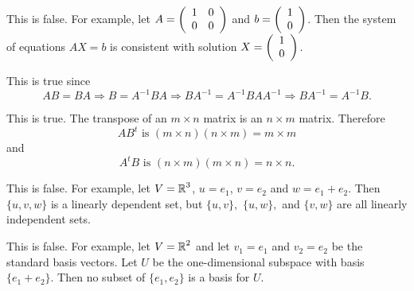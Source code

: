 \documentclass{ximera}
\begin{document}
\begin{exercise}
\begin{solution}
\soln \begin{enumeratea}%
\item This is false. For example, let $A=\left(\begin{array}{rrrrrrrrrrrrrrrrrr} 1 & 0 \\ 0 & 0 \end{array}\right)$ and $b=\left(\begin{array}{rrrrrrrrrrrrrrrrrr} 1\\0 \end{array}\right)$. Then the system of equations $AX=b$ is consistent with solution $X=\left(\begin{array}{rrrrrrrrrrrrrrrrrr} 1\\0 \end{array}\right)$. 
\item This is true since
\[ 
AB = BA \Longrightarrow B = A^{-1}BA \Longrightarrow BA^{-1} = A^{-1}BAA^{-1} \Longrightarrow BA^{-1} = A^{-1}B.
\]
\item This is true.  The transpose of an $m\times n$ matrix is an $n\times m$ matrix. Therefore 
\[
AB^t \mbox{ is }  (m\times n)(n\times m) = m\times m
\]
and
\[
A^tB \mbox{ is }  (n\times m)(m\times n) = n\times n.
\]


\item This is false. For example, let $V=\mbox{$\mathbb{R}$}^3$, $u=e_1$, $v=e_2$ and $w=e_1+e_2$. Then $\{u,v,w\}$ is a linearly dependent set, but $\{u,v\},$ $\{u,w\},$ and $\{v,w\}$ are all linearly independent sets.

\item This is false. For example, let $V=\mbox{$\mathbb{R}$}^2$ and let $v_1=e_1$ and $v_2=e_2$ be the standard basis vectors. Let $U$ be the one-dimensional subspace with basis $\{e_1+e_2\}$. Then no subset of $\{e_1,e_2\}$ is a basis for $U$.
\end{enumeratea}
\end{solution}
\end{exercise}
\end{document}
